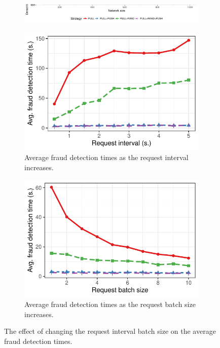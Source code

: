 \begin{figure}[t]
	\centering
	\begin{subfigure}{.8\columnwidth}
		\centering
		\includegraphics[width=.9\linewidth]{trustchain/assets/fraud_experiments_legend}
	\end{subfigure}
	\begin{subfigure}{.5\columnwidth}
		\centering
		\captionsetup{width=.9\linewidth}
		\includegraphics[width=\linewidth]{trustchain/assets/fraud_times_crawl_interval}
		\caption{Average fraud detection times as the request interval increases.}
		\label{fig:experiment_crawl_interval_detection_times}
	\end{subfigure}%
	\begin{subfigure}{.5\columnwidth}
		\centering
		\captionsetup{width=.9\linewidth}
		\includegraphics[width=\columnwidth]{trustchain/assets/fraud_times_crawl_batch_size}
		\caption{Average fraud detection times as the request batch size increases.}
		\label{fig:experiment_crawl_batch_size_detection_times}
	\end{subfigure}
	\caption{The effect of changing the request interval batch size on the average fraud detection times.}
	\label{fig:crawl_experiments}
\end{figure}

